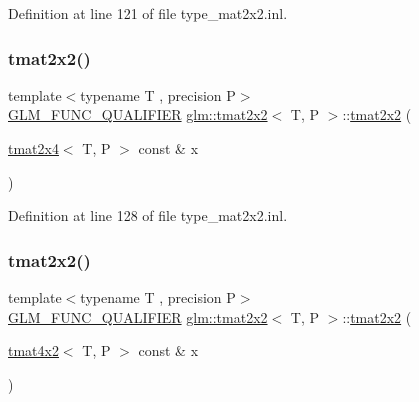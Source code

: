 Definition at line 121 of file type\+\_\+mat2x2.\+inl.

\mbox{\label{structglm_1_1tmat2x2_ada3ffdd9349a053d27ffd29afa096618}} 
\subsubsection{\texorpdfstring{tmat2x2()}{tmat2x2()}\hspace{0.1cm}{\footnotesize\ttfamily [15/22]}}
{\footnotesize\ttfamily template$<$typename T , precision P$>$ \\
\mbox{\hyperlink{setup_8hpp_a33fdea6f91c5f834105f7415e2a64407}{G\+L\+M\+\_\+\+F\+U\+N\+C\+\_\+\+Q\+U\+A\+L\+I\+F\+I\+ER}} \mbox{\hyperlink{structglm_1_1tmat2x2}{glm\+::tmat2x2}}$<$ T, P $>$\+::\mbox{\hyperlink{structglm_1_1tmat2x2}{tmat2x2}} (\begin{DoxyParamCaption}\item[{\mbox{\hyperlink{structglm_1_1tmat2x4}{tmat2x4}}$<$ T, P $>$ const \&}]{x }\end{DoxyParamCaption})}



Definition at line 128 of file type\+\_\+mat2x2.\+inl.

\mbox{\label{structglm_1_1tmat2x2_a470191296126147372f7ba04535e01fb}} 
\subsubsection{\texorpdfstring{tmat2x2()}{tmat2x2()}\hspace{0.1cm}{\footnotesize\ttfamily [16/22]}}
{\footnotesize\ttfamily template$<$typename T , precision P$>$ \\
\mbox{\hyperlink{setup_8hpp_a33fdea6f91c5f834105f7415e2a64407}{G\+L\+M\+\_\+\+F\+U\+N\+C\+\_\+\+Q\+U\+A\+L\+I\+F\+I\+ER}} \mbox{\hyperlink{structglm_1_1tmat2x2}{glm\+::tmat2x2}}$<$ T, P $>$\+::\mbox{\hyperlink{structglm_1_1tmat2x2}{tmat2x2}} (\begin{DoxyParamCaption}\item[{\mbox{\hyperlink{structglm_1_1tmat4x2}{tmat4x2}}$<$ T, P $>$ const \&}]{x }\end{DoxyParamCaption})}



